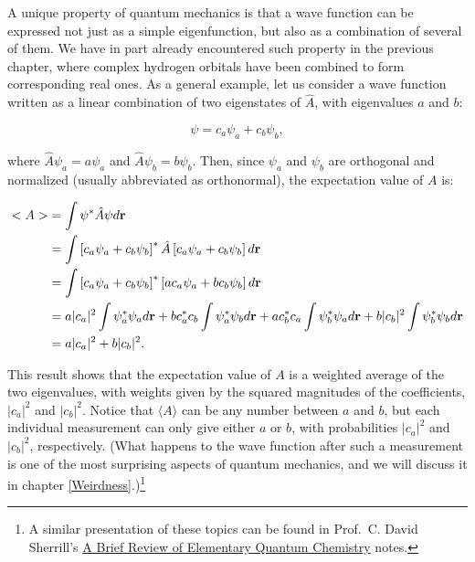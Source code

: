 \documentclass[
  english,
  9pt,
]{extbook}
\theoremstyle{definition}
\theoremstyle{definition}
\theoremstyle{definition}
\theoremstyle{definition}
\theoremstyle{remark}
\begin{document}
A unique property of quantum mechanics is that a wave function can be expressed not just as a simple eigenfunction, but also as a combination of several of them. We have in part already encountered such property in the previous chapter, where complex hydrogen orbitals have been combined to form corresponding real ones. As a general example, let us consider a wave function written as a linear combination of two eigenstates of \(\hat{A}\), with eigenvalues \(a\) and \(b\):

\begin{equation}
\psi = c_a \psi_a + c_b \psi_b,
\label{eq:ee5}
\end{equation}

where \(\hat{A} \psi_a = a \psi_a\) and \(\hat{A} \psi_b = b \psi_b\). Then, since \(\psi_a\) and \(\psi_b\) are orthogonal and normalized (usually abbreviated as orthonormal), the expectation value of \(A\) is:

\begin{equation}
\begin{aligned}
<A> &= \int \psi^{*} \hat{A} \psi d{\bf r} \\
    &= \int \left[ c_a \psi_a + c_b \psi_b \right]^{*} \hat{A} \left[ c_a \psi_a + c_b \psi_b \right] d{\bf r}\\
    &= \int \left[ c_a \psi_a + c_b \psi_b \right]^{*}
\left[ a c_a \psi_a + b c_b \psi_b \right] d{\bf r}\\    
    &= a \vert c_a\vert^2 \int \psi_a^{*} \psi_a d{\bf r} +
b c_a^{*} c_b \int \psi_a^{*} \psi_b d{\bf r} + a c_b^{*} c_a \int \psi_b^{*} \psi_a d{\bf r} +
b \vert c_b\vert^2 \int \psi_b^{*} \psi_b d{\bf r}\\ 
    &= a \vert c_a\vert^2 + b \vert c_b\vert^2.
\end{aligned}
\label{eq:ee6}    
\end{equation}

This result shows that the expectation value of \(A\) is a weighted average of the two eigenvalues, with weights given by the squared magnitudes of the coefficients, \(\vert c_a\vert^2\) and \(\vert c_b\vert^2\). Notice that \(\langle A\rangle\) can be any number between \(a\) and \(b\), but each individual measurement can only give either \(a\) or \(b\), with probabilities \(\vert c_a\vert^2\) and \(\vert c_b\vert^2\), respectively. (What happens to the wave function after such a measurement is one of the most surprising aspects of quantum mechanics, and we will discuss it in chapter \ref{Weirdness}.)\footnote{A similar presentation of these topics can be found in Prof.~C. David Sherrill's \href{http://vergil.chemistry.gatech.edu/notes/quantrev/node1.html}{A Brief Review of Elementary Quantum Chemistry} notes.}
\end{document}
